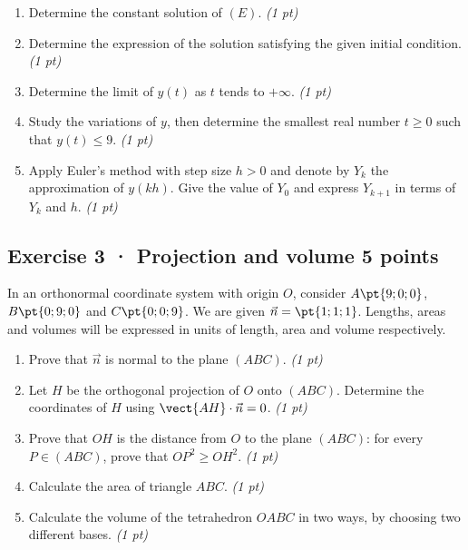 \begin{enumerate}

\item Determine the constant solution of $(E)$. \hfill\textit{(1 pt)}

\item Determine the expression of the solution satisfying the given initial condition. \hfill\textit{(1 pt)}

\item Determine the limit of $y(t)$ as $t$ tends to $+\infty$. \hfill\textit{(1 pt)}

\item Study the variations of $y$, then determine the smallest real number $t\ge0$ such that $y(t)\le9$. \hfill\textit{(1 pt)}

\item Apply Euler's method with step size $h>0$ and denote by $Y_k$ the approximation of $y(kh)$. Give the value of $Y_0$ and express $Y_{k+1}$ in terms of $Y_k$ and $h$. \hfill\textit{(1 pt)}

\end{enumerate}

\mxnewpage{}

\subsection*{Exercise 3 · Projection and volume \hfill 5 points}In an orthonormal coordinate system with origin $O$, consider $A\pt{9;0;0}$, $B\pt{0;9;0}$ and $C\pt{0;0;9}$. We are given $\vec n=\pt{1;1;1}$. Lengths, areas and volumes will be expressed in units of length, area and volume respectively.

\begin{enumerate}

\item Prove that $\vec n$ is normal to the plane $(ABC)$. \hfill\textit{(1 pt)}

\item Let $H$ be the orthogonal projection of $O$ onto $(ABC)$. Determine the coordinates of $H$ using $\vect{AH}\cdot\vec n=0$. \hfill\textit{(1 pt)}

\item Prove that $OH$ is the distance from $O$ to the plane $(ABC)$: for every $P\in(ABC)$, prove that $OP^2\ge OH^2$. \hfill\textit{(1 pt)}

\item Calculate the area of triangle $ABC$. \hfill\textit{(1 pt)}

\item Calculate the volume of the tetrahedron $OABC$ in two ways, by choosing two different bases. \hfill\textit{(1 pt)}

\end{enumerate}

